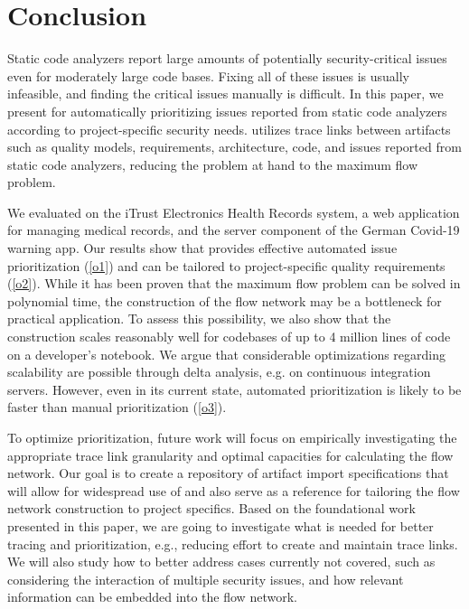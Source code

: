 \section{Conclusion}
\label{sec:conslusion}
Static code analyzers report large amounts of potentially security-critical issues even for moderately large code bases.
Fixing all of these issues is usually infeasible, and finding the critical issues manually is difficult.
In this paper, we present \appr{} for automatically prioritizing issues reported from static code analyzers according to project-specific security needs.
\appr{} utilizes trace links between artifacts such as quality models, requirements, architecture, code, and issues reported from static code analyzers, reducing the problem at hand to the maximum flow problem.

We evaluated \appr{} on the iTrust Electronics Health Records system, a web application for managing medical records, and the server component of the German Covid-19 warning app.
Our results show that \appr{} provides effective automated issue prioritization (\ref{o1}) and can be tailored to project-specific quality requirements (\ref{o2}).
While it has been proven that the maximum flow problem can be solved in polynomial time, the construction of the flow network may be a bottleneck for practical application.
To assess this possibility, we also show that the construction scales reasonably well for codebases of up to 4 million lines of code on a developer's notebook.
We argue that considerable optimizations regarding scalability are possible through delta analysis, e.g. on continuous integration servers.
However, even in its current state,  automated prioritization is likely to be faster than manual prioritization (\ref{o3}).

To optimize prioritization, future work will focus on empirically investigating the appropriate trace link granularity and optimal capacities for calculating the flow network.
Our goal is to create a repository of artifact import specifications that will allow for widespread use of \appr{} and also serve as a reference for tailoring the flow network construction to project specifics.%
Based on the foundational work presented in this paper, we are going to investigate what is needed for better tracing and prioritization, e.g., reducing effort to create and maintain trace links.
We will also study how to better address cases currently not covered, such as considering the interaction of multiple security issues, and how relevant information can be embedded into the flow network.

